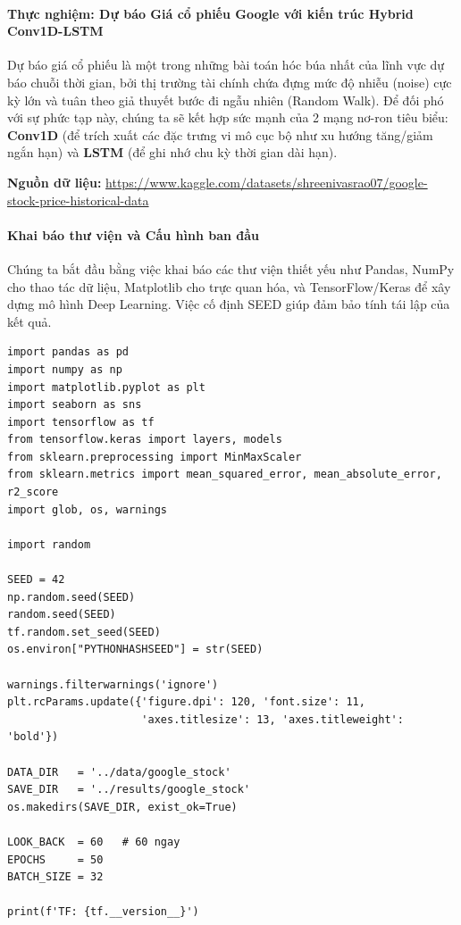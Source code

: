 \paragraph{Thực nghiệm: Dự báo Giá cổ phiếu Google với kiến trúc Hybrid Conv1D-LSTM} \hfill\mbox{}

Dự báo giá cổ phiếu là một trong những bài toán hóc búa nhất của lĩnh vực dự báo chuỗi thời gian, bởi thị trường tài chính chứa đựng mức độ nhiễu (noise) cực kỳ lớn và tuân theo giả thuyết bước đi ngẫu nhiên (Random Walk). Để đối phó với sự phức tạp này, chúng ta sẽ kết hợp sức mạnh của 2 mạng nơ-ron tiêu biểu: \textbf{Conv1D} (để trích xuất các đặc trưng vi mô cục bộ như xu hướng tăng/giảm ngắn hạn) và \textbf{LSTM} (để ghi nhớ chu kỳ thời gian dài hạn).

\begin{center}
    \textbf{Nguồn dữ liệu:} \url{https://www.kaggle.com/datasets/shreenivasrao07/google-stock-price-historical-data}
\end{center}

\paragraph{Khai báo thư viện và Cấu hình ban đầu} \hfill\mbox{}

Chúng ta bắt đầu bằng việc khai báo các thư viện thiết yếu như Pandas, NumPy cho thao tác dữ liệu, Matplotlib cho trực quan hóa, và TensorFlow/Keras để xây dựng mô hình Deep Learning. Việc cố định SEED giúp đảm bảo tính tái lập của kết quả.

\begin{lstlisting}[style=pythoncode, caption={Khai báo thư viện và thiết lập thông số cơ bản}]
import pandas as pd
import numpy as np
import matplotlib.pyplot as plt
import seaborn as sns
import tensorflow as tf
from tensorflow.keras import layers, models
from sklearn.preprocessing import MinMaxScaler
from sklearn.metrics import mean_squared_error, mean_absolute_error, r2_score
import glob, os, warnings

import random

SEED = 42
np.random.seed(SEED)
random.seed(SEED)
tf.random.set_seed(SEED)
os.environ["PYTHONHASHSEED"] = str(SEED)

warnings.filterwarnings('ignore')
plt.rcParams.update({'figure.dpi': 120, 'font.size': 11,
                     'axes.titlesize': 13, 'axes.titleweight': 'bold'})

DATA_DIR   = '../data/google_stock'
SAVE_DIR   = '../results/google_stock'
os.makedirs(SAVE_DIR, exist_ok=True)

LOOK_BACK  = 60   # 60 ngay
EPOCHS     = 50
BATCH_SIZE = 32

print(f'TF: {tf.__version__}')
\end{lstlisting}

